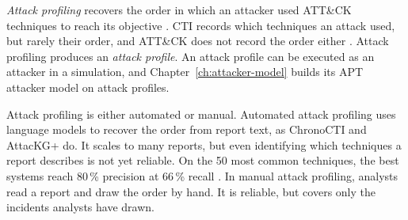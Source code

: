 \documentclass{cshonours}
\begin{document}
\emph{Attack profiling} recovers the order in which an
attacker used ATT\&CK techniques to reach its objective
\citep{rodriguez2024}. CTI records which techniques an attack used, but
rarely their order, and ATT\&CK does not record the order either
\citep{ferraz2026}. Attack profiling produces an \emph{attack
profile}. An attack profile can be executed as an attacker in a simulation, and
Chapter~\ref{ch:attacker-model} builds its APT attacker model on attack
profiles.

Attack profiling is either automated or manual. Automated attack profiling
uses language models to recover the order from report text, as ChronoCTI
\citep{rahman2025} and AttacKG+ \citep{zhangY2025} do. It scales to many
reports, but even identifying which techniques a report describes is not
yet reliable. On the 50 most common techniques, the best systems reach
80\,\% precision at 66\,\% recall \citep{buchel2025}. In manual attack
profiling, analysts read a report and draw the order by hand. It is
reliable, but covers only the incidents analysts have drawn.
\end{document}
